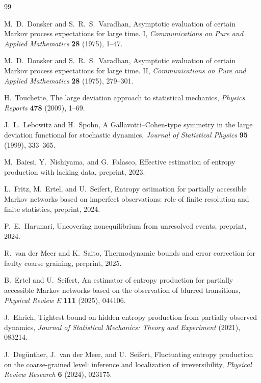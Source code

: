 \documentclass[11pt,a4paper]{article}
\numberwithin{equation}{section}
\theoremstyle{thmcompact}
\theoremstyle{remark}
\begin{document}
\begin{thebibliography}{99}

M.~D.~Donsker and S.~R.~S.~Varadhan,
\newblock Asymptotic evaluation of certain Markov process expectations for large time. I,
\newblock \emph{Communications on Pure and Applied Mathematics} \textbf{28} (1975), 1--47.

M.~D.~Donsker and S.~R.~S.~Varadhan,
\newblock Asymptotic evaluation of certain Markov process expectations for large time. II,
\newblock \emph{Communications on Pure and Applied Mathematics} \textbf{28} (1975), 279--301.

H.~Touchette,
\newblock The large deviation approach to statistical mechanics,
\newblock \emph{Physics Reports} \textbf{478} (2009), 1--69.

J.~L.~Lebowitz and H.~Spohn,
\newblock A Gallavotti--Cohen-type symmetry in the large deviation functional for stochastic dynamics,
\newblock \emph{Journal of Statistical Physics} \textbf{95} (1999), 333--365.

M.~Baiesi, Y.~Nishiyama, and G.~Falasco,
\newblock Effective estimation of entropy production with lacking data,
\newblock preprint, 2023.

L.~Fritz, M.~Ertel, and U.~Seifert,
\newblock Entropy estimation for partially accessible Markov networks based on imperfect observations: role of finite resolution and finite statistics,
\newblock preprint, 2024.

P.~E.~Harunari,
\newblock Uncovering nonequilibrium from unresolved events,
\newblock preprint, 2024.

R.~van der Meer and K.~Saito,
\newblock Thermodynamic bounds and error correction for faulty coarse graining,
\newblock preprint, 2025.

B.~Ertel and U.~Seifert,
\newblock An estimator of entropy production for partially accessible Markov networks based on the observation of blurred transitions,
\newblock \emph{Physical Review E} \textbf{111} (2025), 044106.

J.~Ehrich,
\newblock Tightest bound on hidden entropy production from partially observed dynamics,
\newblock \emph{Journal of Statistical Mechanics: Theory and Experiment} (2021), 083214.

J.~Deg\"unther, J.~van der Meer, and U.~Seifert,
\newblock Fluctuating entropy production on the coarse-grained level: inference and localization of irreversibility,
\newblock \emph{Physical Review Research} \textbf{6} (2024), 023175.


\end{thebibliography}
\end{document}
